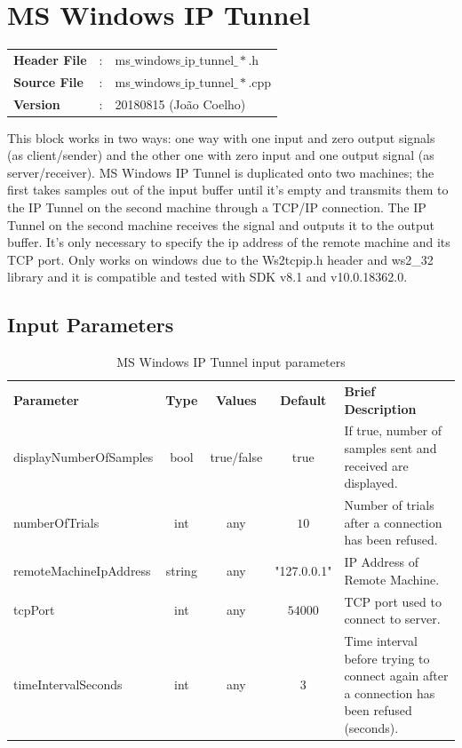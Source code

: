 \clearpage

\section{MS Windows IP Tunnel}

\begin{tcolorbox}	
	\begin{tabular}{p{2.75cm} p{0.2cm} p{10.5cm}} 	
		\textbf{Header File}   &:& ms$\_$windows$\_$ip$\_$tunnel$\_*$.h \\
		\textbf{Source File}   &:& ms$\_$windows$\_$ip$\_$tunnel$\_*$.cpp \\
        \textbf{Version}       &:& 20180815 (Jo\~ao Coelho) \\
	\end{tabular}
\end{tcolorbox}

This block works in two ways: one way with one input and zero output signals (as client/sender) and the other one with zero input and one output signal (as server/receiver).
MS Windows IP Tunnel is duplicated onto two machines; the first takes samples out of the input buffer until it's empty and transmits them to the IP Tunnel on the second machine through a TCP/IP connection. The IP Tunnel on the second machine receives the signal and outputs it to the output buffer.
It's only necessary to specify the ip address of the remote machine and its TCP port.
Only works on windows due to the Ws2tcpip.h header and ws2\_32 library and it is compatible and tested with SDK v8.1 and v10.0.18362.0.

\subsection*{Input Parameters}

\begin{table}[h]
	\centering
	\begin{tabular}{|l|c|c|c|p{50mm}|}
		\cline{1-5}
		\textbf{Parameter} & \textbf{Type} & \textbf{Values} &   \textbf{Default}& \textbf{Brief Description} \\ \cline{1-5}
		
        displayNumberOfSamples & bool & true/false & true & If true, number of samples sent and received are displayed.\\ \cline{1-5}
		numberOfTrials & int & any & $10$ & Number of trials after a connection has been refused.\\ \cline{1-5}
		remoteMachineIpAddress & string & any & "127.0.0.1" & IP Address of Remote Machine.\\ \cline{1-5}
		tcpPort & int & any & $54000$ & TCP port used to connect to server.\\ \cline{1-5}
		timeIntervalSeconds & int & any & $3$ & Time interval before trying to connect again after a connection has been refused (seconds).\\ \cline{1-5}
	\end{tabular}
	\caption{MS Windows IP Tunnel input parameters}
	\label{table:ipt_in_par}
\end{table}

